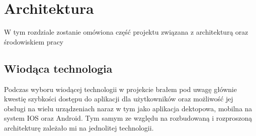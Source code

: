 \chapter{Architektura}
\label{ch:funplenop}

W tym rozdziale zostanie omówiona część projektu związana z architekturą oraz środowiskiem pracy

\section{Wiodąca technologia}


Podczas wyboru wiodącej technologii w projekcie brałem pod uwagę głównie kwestię szybkości dostępu do aplikacji dla użytkowników oraz możliwość jej obsługi na wielu urządzeniach naraz w tym jako aplikacja dektopowa, mobilna na system IOS oraz Android. Tym samym ze względu na rozbudowaną i rozproszoną architekturę zależało mi na jednolitej technologii.

